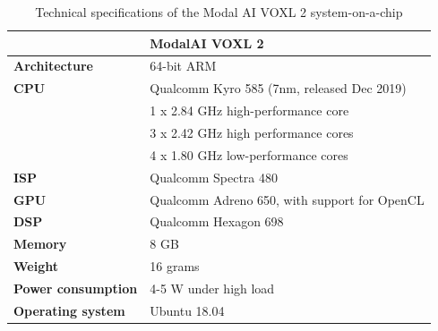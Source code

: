 \begin{table}[htbp]
    \centering
    \begin{tabular}{@{}ll@{}}
        \toprule
        \textbf{} & \textbf{ModalAI VOXL 2}\\
        \midrule
        \textbf{Architecture} & 64-bit ARM\\
        \textbf{CPU} & Qualcomm Kyro 585 (7nm, released Dec 2019)\\
                     & 1 x 2.84 GHz high-performance core\\
                     & 3 x 2.42 GHz high performance cores\\
                     & 4 x 1.80 GHz low-performance cores\\
        \textbf{ISP} & Qualcomm Spectra 480\\
        \textbf{GPU} & Qualcomm Adreno 650, with support for OpenCL\\
        \textbf{DSP} & Qualcomm Hexagon 698\\
        \textbf{Memory} & 8 GB\\
        \textbf{Weight} & 16 grams\\
        \textbf{Power consumption} & 4-5 W under high load\\
        \textbf{Operating system} & Ubuntu 18.04\\
        \bottomrule
    \end{tabular}
    \caption{Technical specifications of the Modal AI VOXL 2 system-on-a-chip}
    \label{tab:voxl2-specs}
\end{table}

